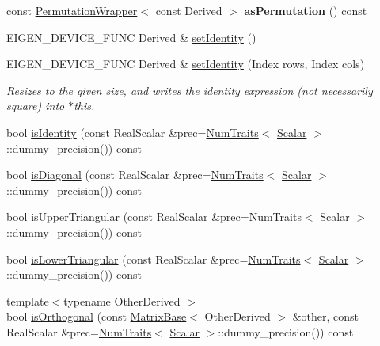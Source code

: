 \begin{DoxyCompactItemize}
const \mbox{\hyperlink{class_eigen_1_1_permutation_wrapper}{Permutation\+Wrapper}}$<$ const Derived $>$ {\bfseries as\+Permutation} () const
\item 
E\+I\+G\+E\+N\+\_\+\+D\+E\+V\+I\+C\+E\+\_\+\+F\+U\+NC Derived \& \mbox{\hyperlink{class_eigen_1_1_matrix_base_ae05be7fcc1ade707f0b73eb5f9d8cf33}{set\+Identity}} ()
\item 
E\+I\+G\+E\+N\+\_\+\+D\+E\+V\+I\+C\+E\+\_\+\+F\+U\+NC Derived \& \mbox{\hyperlink{class_eigen_1_1_matrix_base_a054e0ad7e745cb1b9f2e87807e4d2200}{set\+Identity}} (Index rows, Index cols)
\begin{DoxyCompactList}\small\item\em Resizes to the given size, and writes the identity expression (not necessarily square) into $\ast$this. \end{DoxyCompactList}\item 
bool \mbox{\hyperlink{class_eigen_1_1_matrix_base_a4ccbd8dfa06e9d47b9bf84711f8b9d40}{is\+Identity}} (const Real\+Scalar \&prec=\mbox{\hyperlink{struct_eigen_1_1_num_traits}{Num\+Traits}}$<$ \mbox{\hyperlink{class_eigen_1_1_dense_base_a5feed465b3a8e60c47e73ecce83e39a2}{Scalar}} $>$\+::dummy\+\_\+precision()) const
\item 
bool \mbox{\hyperlink{class_eigen_1_1_matrix_base_a97027ea54c8cd1ddb1c578fee5cedc67}{is\+Diagonal}} (const Real\+Scalar \&prec=\mbox{\hyperlink{struct_eigen_1_1_num_traits}{Num\+Traits}}$<$ \mbox{\hyperlink{class_eigen_1_1_dense_base_a5feed465b3a8e60c47e73ecce83e39a2}{Scalar}} $>$\+::dummy\+\_\+precision()) const
\item 
bool \mbox{\hyperlink{class_eigen_1_1_matrix_base_aae3ec1660bb4ac584220481c54ab4a64}{is\+Upper\+Triangular}} (const Real\+Scalar \&prec=\mbox{\hyperlink{struct_eigen_1_1_num_traits}{Num\+Traits}}$<$ \mbox{\hyperlink{class_eigen_1_1_dense_base_a5feed465b3a8e60c47e73ecce83e39a2}{Scalar}} $>$\+::dummy\+\_\+precision()) const
\item 
bool \mbox{\hyperlink{class_eigen_1_1_matrix_base_a1e96c42d79a56f0a6ade30ce031e17eb}{is\+Lower\+Triangular}} (const Real\+Scalar \&prec=\mbox{\hyperlink{struct_eigen_1_1_num_traits}{Num\+Traits}}$<$ \mbox{\hyperlink{class_eigen_1_1_dense_base_a5feed465b3a8e60c47e73ecce83e39a2}{Scalar}} $>$\+::dummy\+\_\+precision()) const
\item 
{\footnotesize template$<$typename Other\+Derived $>$ }\\bool \mbox{\hyperlink{class_eigen_1_1_matrix_base_aefdc8e4e4c156fdd79a21479e75dcd8a}{is\+Orthogonal}} (const \mbox{\hyperlink{class_eigen_1_1_matrix_base}{Matrix\+Base}}$<$ Other\+Derived $>$ \&other, const Real\+Scalar \&prec=\mbox{\hyperlink{struct_eigen_1_1_num_traits}{Num\+Traits}}$<$ \mbox{\hyperlink{class_eigen_1_1_dense_base_a5feed465b3a8e60c47e73ecce83e39a2}{Scalar}} $>$\+::dummy\+\_\+precision()) const

\end{DoxyCompactItemize}

